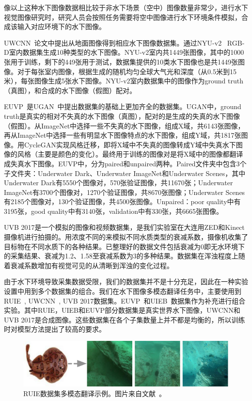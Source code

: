 像以上这种水下图像数据相比较于非水下场景（空中）图像数量非常少，进行水下视觉图像研究时，研究人员会按照任务需要将空中图像进行水下环境条件模拟，合成该输入对应环境下的水下图像。

UWCNN~\cite{li2020underwater}论文中提出从地面图像得到相应水下图像数据集。通过NYU-v2~\cite{silberman2012indoor} RGB-D室内数据集生成10种类型的水下图像。NYU-v2室内共1449张图像，其中的1000张用于训练，剩下的449张用于测试，数据集提供的10类水下图像也是共1449张图像。对于每张室内图像，根据生成的随机均匀全球大气光和深度（从0.5米到15米），每张图像生成5张水下图像。NYU-v2室内数据集中的图像作为ground truth（真图），和合成的水下图像（假图）配对。

EUVP~\cite{islam2020fast}是UGAN~\cite{fabbri2018enhancing}中提出数据集的基础上更加齐全的数据集。UGAN中，ground truth是真实的相对不失真的水下图像（真图），配对的是生成的失真的水下图像（假图）。从ImageNet中选择一些不失真的水下图像，组成X域，共6143张图像，再从ImageNet中选择一些有明显水下图像特点的水下图像，组成Y域，共1817张图像。用CycleGAN实现风格迁移，即将X域中不失真的图像转成Y域中失真水下图像的风格（主要是颜色的变化）。最终用于训练的图像对是将X域中的图像都翻译成失真水下图像。EUVP中，分为paired和unpaired两种。Paired文件夹中包含3个子文件夹：Underwater Dark、Underwater ImageNet和Underwater Scenes，其中Underwater Dark有5550个图像对，570张验证图像，共11670张；Underwater ImageNet有3700个图像对，1270个验证图像，共8670张图像；Underwater Scenes有2185个图像对，130个验证图像，共4500张图像。Unpaired：poor quality中有3195张，good quality中有3140张，validation中有330张，共6665张图像。

UVB 2017是一个模拟的图像和视频数据集，是我们实验室在大连用ZED和Kinect摄像机进行拍摄的。用浓度不同的来模拟不同水质类型的衰减系数，摄像机收集了目标物在不同水质下的各种结果。已整理好的数据文件包括衰减为0即无水环境下的采集结果、衰减为1.2、1.58至衰减系数为3的多种结果。数据集在浑浊程度上随着衰减系数增加有视觉可见的从清晰到浑浊的变化过程。


由于水下环境导致采集数据受限，我们的数据集并不是十分充足，因此在一种实验设置中用到多个数据集的组合。我们在水下图像多模态翻译任务中，主要使用到RUIE~\citep{liu2019real}, UWCNN~\citep{li2020underwater}, UVB 2017数据集。EUVP~\citep{islam2020fast}和UIEB~\citep{li2019underwater}数据集作为补充进行组合实验。其中RUIE，UIEB和EUVP部分数据集是真实世界水下图像，UWCNN和UVB 2017是合成图像。这些数据集在各个子集数量上并不都是均衡的，所以训练时对模型方法提出了较高的要求。

\begin{figure}[htp]
    \centering
	\includegraphics[width=\textwidth]{figures/ruie-dataset.pdf}
	\caption{RUIE数据集多模态翻译示例。图片来自文献~\cite{liu2019real,islam2020fast}。}
	\label{fig:ruie_dataset}
\end{figure}

